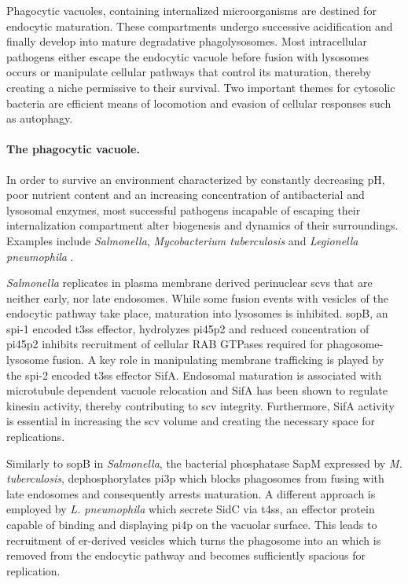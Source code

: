 Phagocytic vacuoles, containing internalized microorganisms are destined for endocytic maturation. These compartments undergo successive acidification and finally develop into mature degradative phagolysosomes. Most intracellular pathogens either escape the endocytic vacuole before fusion with lysosomes occurs or manipulate cellular pathways that control its maturation, thereby creating a niche permissive to their survival. Two important themes for cytosolic bacteria are efficient means of locomotion and evasion of cellular responses such as autophagy.

\paragraph{The phagocytic vacuole.}
In order to survive an environment characterized by constantly decreasing pH, poor nutrient content and an increasing concentration of antibacterial and lysosomal enzymes, most successful pathogens incapable of escaping their internalization compartment alter biogenesis and dynamics of their surroundings. Examples include \textit{Salmonella}, \textit{Mycobacterium tuberculosis} and \textit{Legionella pneumophila} \citep{Ham2011}.

\textit{Salmonella} replicates in plasma membrane derived perinuclear \glspl{scv} that are neither early, nor late endosomes. While some fusion events with vesicles of the endocytic pathway take place, maturation into lysosomes is inhibited. \Acrshort{sop}B, an \acrshort{spi}-1 encoded \gls{t3ss} effector, hydrolyzes \gls{pi45p2} and reduced concentration of \gls{pi45p2} inhibits recruitment of cellular RAB GTPases required for phagosome-lysosome fusion. A key role in manipulating membrane trafficking is played by the \acrshort{spi}-2 encoded \gls{t3ss} effector SifA. Endosomal maturation is associated with microtubule dependent vacuole relocation and SifA has been shown to regulate kinesin activity, thereby contributing to \gls{scv} integrity. Furthermore, SifA activity is essential in increasing the \gls{scv} volume and creating the necessary space for replications.

Similarly to \Acrshort{sop}B in \textit{Salmonella}, the bacterial phosphatase SapM expressed by \textit{M. tuberculosis}, dephosphorylates \gls{pi3p} which blocks phagosomes from fusing with late endosomes and consequently arrests maturation. A different approach is employed by \textit{L. pneumophila} which secrete SidC via \gls{t4ss}, an effector protein capable of binding and displaying \gls{pi4p} on the vacuolar surface. This leads to recruitment of \acrshort{er}-derived vesicles which turns the phagosome into an  which is removed from the endocytic pathway and becomes sufficiently spacious for replication.

